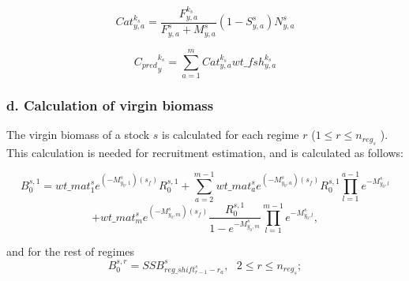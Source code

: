 \documentclass{article}
\begin{document}
\begin{equation}
Cat^{k_s}_{y,a} = \dfrac{F^{k_s}_{y,a}}{F^s_{y,a}+M^{s}_{y,a}}\left(1-S^s_{y,a}\right)N^s_{y,a}
\end{equation}


\begin{equation}
{C_{pred}}^{k_s}_y = \sum_{a=1}^{m}Cat^{k_s}_{y,a} wt\_fsh^{k_s}_{y,a}
\end{equation}



\hfill

\subsubsection{d. Calculation of virgin biomass}

The virgin biomass of a stock $s$ is calculated for each regime $r$ ($1 \leq r \leq n_{reg_s}$%
). This calculation is needed for recruitment estimation, and is calculated as follows:

\begin{equation} \label{eq: b01}
    B^{s,1}_0 = wt\_{mat}^s_1 e^{(-M^s_{y_0,1})(s_f)} R^{s,1}_0
  +\sum_{a=2}^{m-1} wt\_{mat}^s_a e^{(-M^s_{y_0,a})(s_f)} R^{s,1}_0\prod_{l=1}^{a-1}e^{-M^s_{y_0,l}} 
\end{equation}
\begin{equation*} 
    + wt\_{mat}^s_{m} e^{(-M^s_{y_0,m})(s_f)}\frac{R^{s,1}_0}{1-e^{-M^s_{y_0,m}}}\prod_{l=1}^{m-1}e^{-M^s_{y_0,l}},
\end{equation*}

and for the rest of regimes
\begin{equation} \label{eq: b0r}
    B^{s,r}_0 = SSB^s_{reg\_shift^s_{r-1}-r_a}, \ \ \ 2\leq r \leq n_{reg_s};
\end{equation}
\end{document}
